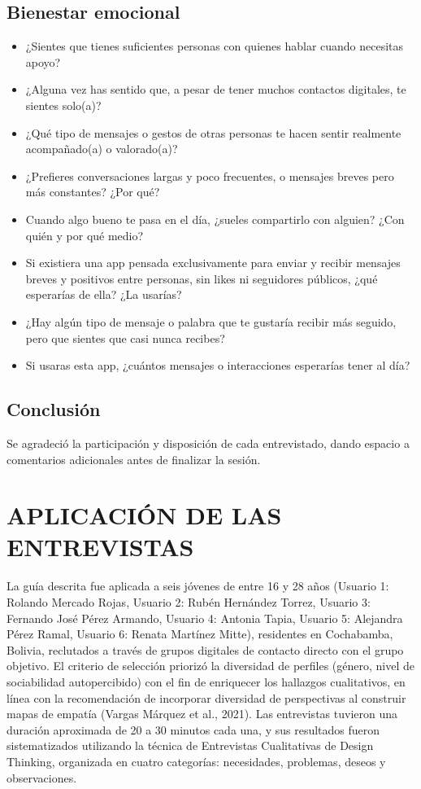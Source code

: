 \subsection{Bienestar emocional}
\begin{itemize}
    \item ¿Sientes que tienes suficientes personas con quienes hablar cuando necesitas apoyo?
    \item ¿Alguna vez has sentido que, a pesar de tener muchos contactos digitales, te sientes solo(a)?
    \item ¿Qué tipo de mensajes o gestos de otras personas te hacen sentir realmente acompañado(a) o valorado(a)?
    \item ¿Prefieres conversaciones largas y poco frecuentes, o mensajes breves pero más constantes? ¿Por qué?
    \item Cuando algo bueno te pasa en el día, ¿sueles compartirlo con alguien? ¿Con quién y por qué medio?
    \item Si existiera una app pensada exclusivamente para enviar y recibir mensajes breves y positivos entre personas, sin likes ni seguidores públicos, ¿qué esperarías de ella? ¿La usarías?
    \item ¿Hay algún tipo de mensaje o palabra que te gustaría recibir más seguido, pero que sientes que casi nunca recibes?
    \item Si usaras esta app, ¿cuántos mensajes o interacciones esperarías tener al día?
\end{itemize}

\subsection{Conclusión}
Se agradeció la participación y disposición de cada entrevistado, dando espacio a comentarios adicionales antes de finalizar la sesión.

\section{APLICACIÓN DE LAS ENTREVISTAS}
La guía descrita fue aplicada a seis jóvenes de entre 16 y 28 años (Usuario 1: Rolando Mercado Rojas, Usuario 2: Rubén Hernández Torrez, Usuario 3: Fernando José Pérez Armando, Usuario 4: Antonia Tapia, Usuario 5: Alejandra Pérez Ramal, Usuario 6: Renata Martínez Mitte), residentes en Cochabamba, Bolivia, reclutados a través de grupos digitales de contacto directo con el grupo objetivo. El criterio de selección priorizó la diversidad de perfiles (género, nivel de sociabilidad autopercibido) con el fin de enriquecer los hallazgos cualitativos, en línea con la recomendación de incorporar diversidad de perspectivas al construir mapas de empatía (Vargas Márquez et al., 2021). Las entrevistas tuvieron una duración aproximada de 20 a 30 minutos cada una, y sus resultados fueron sistematizados utilizando la técnica de Entrevistas Cualitativas de Design Thinking, organizada en cuatro categorías: necesidades, problemas, deseos y observaciones.

